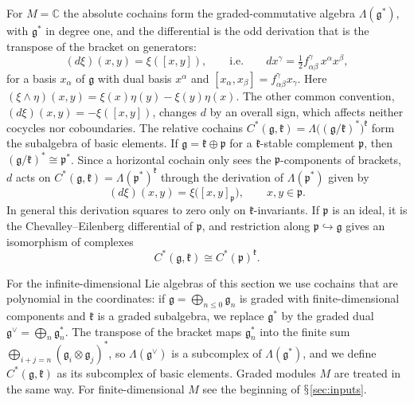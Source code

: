 \documentclass[11pt]{amsart}
\numberwithin{equation}{section}
\renewcommand{\S}{\mbox{$\mathsection$}}
\theoremstyle{definition}
\theoremstyle{remark}
\newcommand{\C}{\mathbb{C}}
\newcommand{\g}{\mathfrak{g}}
\begin{document}
For $M=\C$ the absolute cochains form the graded-commutative algebra $\Lambda(\g^*)$, with $\g^*$ in degree one, and the differential is the odd derivation that is the transpose of the bracket on generators:
\begin{equation}\label{eq:CEsign}
(d\xi)(x,y)=\xi([x,y]),\qquad\text{i.e.}\qquad dx^\gamma=\tfrac12f^\gamma_{\alpha\beta}\,x^\alpha x^\beta,
\end{equation}
for a basis $x_\alpha$ of $\g$ with dual basis $x^\alpha$ and $[x_\alpha,x_\beta]=f^\gamma_{\alpha\beta}x_\gamma$. Here $(\xi\wedge\eta)(x,y)=\xi(x)\eta(y)-\xi(y)\eta(x)$. The other common convention, $(d\xi)(x,y)=-\xi([x,y])$, changes $d$ by an overall sign, which affects neither cocycles nor coboundaries. The relative cochains $C^*(\g,\mathfrak k)=\Lambda\bigl((\g/\mathfrak k)^*\bigr)^{\mathfrak k}$ form the subalgebra of basic elements. If $\g=\mathfrak k\oplus\mathfrak p$ for a $\mathfrak k$-stable complement $\mathfrak p$, then $(\g/\mathfrak k)^*\cong\mathfrak p^*$. Since a horizontal cochain only sees the $\mathfrak p$-components of brackets, $d$ acts on $C^*(\g,\mathfrak k)=\Lambda(\mathfrak p^*)^{\mathfrak k}$ through the derivation of $\Lambda(\mathfrak p^*)$ given by
\begin{equation}\label{eq:relative-d}
(d\xi)(x,y)=\xi\bigl([x,y]_{\mathfrak p}\bigr),\qquad x,y\in\mathfrak p .
\end{equation}
In general this derivation squares to zero only on $\mathfrak k$-invariants. If $\mathfrak p$ is an ideal, it is the Chevalley--Eilenberg differential of $\mathfrak p$, and restriction along $\mathfrak p\hookrightarrow\g$ gives an isomorphism of complexes
\begin{equation}\label{eq:relideal}
C^*(\g,\mathfrak k)\cong C^*(\mathfrak p)^{\mathfrak k}.
\end{equation}

For the infinite-dimensional Lie algebras of this section we use cochains that are polynomial in the coordinates: if $\g=\bigoplus_{n\le0}\g_n$ is graded with finite-dimensional components and $\mathfrak k$ is a graded subalgebra, we replace $\g^*$ by the graded dual $\g^\vee=\bigoplus_n\g_n^*$. The transpose of the bracket maps $\g_n^*$ into the finite sum $\bigoplus_{i+j=n}(\g_i\otimes\g_j)^*$, so $\Lambda(\g^\vee)$ is a subcomplex of $\Lambda(\g^*)$, and we define $C^*(\g,\mathfrak k)$ as its subcomplex of basic elements. Graded modules $M$ are treated in the same way. For finite-dimensional $M$ see the beginning of \S\ref{sec:inputs}.
\end{document}
